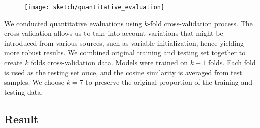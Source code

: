 \begin{figure}[!htb]
\centering
\texttt{[image: sketch/quantitative\_evaluation]}
\label{fig:quantitative_evaluation}
\end{figure}

We conducted quantitative evaluations using $k$-fold cross-validation process. The cross-validation allows us to take into account variations that might be introduced from various sources, such as variable initialization, hence yielding more robust results. We combined original training and testing set together to create $k$ folds cross-validation data. Models were trained on $k-1$ folds. Each fold is used as the testing set once, and the cosine similarity is averaged from test samples.  We choose $k=7$ to preserve the original proportion of the training and testing data.








\subsection{Result}

